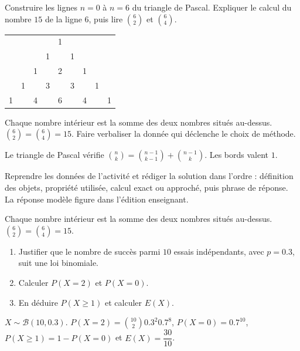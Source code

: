 \begin{activity}
Construire les lignes $n=0$ à $n=6$ du triangle de Pascal. Expliquer le calcul du nombre $15$ de la ligne $6$, puis lire $\binom62$ et $\binom64$.
\begin{center}\begin{tabular}{*{9}{c}}&&&&1&&&&\\&&&1&&1&&&\\&&1&&2&&1&&\\&1&&3&&3&&1&\\1&&4&&6&&4&&1\end{tabular}\end{center}
\end{activity}
\begin{solution}Chaque nombre intérieur est la somme des deux nombres situés au-dessus. $\binom62=\binom64=15$. Faire verbaliser la donnée qui déclenche le choix de méthode.\end{solution}

\begin{summary}Le triangle de Pascal vérifie $\binom nk=\binom{n-1}{k-1}+\binom{n-1}{k}$. Les bords valent $1$.\end{summary}

\begin{example}
Reprendre les données de l'activité et rédiger la solution dans l'ordre : définition des objets, propriété utilisée, calcul exact ou approché, puis phrase de réponse. La réponse modèle figure dans l'édition enseignant.
\end{example}
\begin{solution}Chaque nombre intérieur est la somme des deux nombres situés au-dessus. $\binom62=\binom64=15$.\end{solution}

\begin{exercise}[essentiel]
\begin{enumerate}\item Justifier que le nombre de succès parmi $10$ essais indépendants, avec $p=\num{0,3}$, suit une loi binomiale.\item Calculer $P(X=2)$ et $P(X=0)$.\item En déduire $P(X\geq1)$ et calculer $E(X)$.\end{enumerate}
\end{exercise}
\begin{solution}$X\sim\mathcal B(10,\num{0,3})$. $P(X=2)=\binom{10}2 \num{0,3}^2 \num{0,7}^{8}$, $P(X=0)=\num{0,7}^{10}$, $P(X\geq1)=1-P(X=0)$ et $E(X)=\dfrac{30}{10}$.\end{solution}

